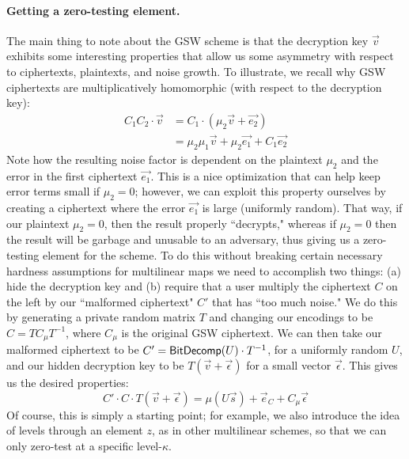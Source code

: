 \paragraph{Getting a zero-testing element.}
The main thing to note about the GSW scheme is that the decryption key $\vec{v}$ exhibits some interesting properties that allow us some asymmetry with respect to ciphertexts, plaintexts, and noise growth.  To illustrate, we recall why GSW ciphertexts are multiplicatively homomorphic (with respect to the decryption key):
\begin{align*}
C_1C_2\cdot \vec{v} &= C_1\cdot (\mu_2 \vec{v} + \vec{e_2})\\
&= \mu_2\mu_1 \vec{v} + \mu_2\vec{e_1}+ C_1\vec{e_2}
\end{align*}
Note how the resulting noise factor is dependent on the plaintext $\mu_2$ and the error in the first ciphertext $\vec{e_1}$.  This is a nice optimization that can help keep error terms small if $\mu_2 = 0$; however, we can exploit this property ourselves by creating a ciphertext where the error $\vec{e_1}$ is large (uniformly random).  That way, if our plaintext $\mu_2 = 0$, then the result properly ``decrypts," whereas if $\mu_2 = 0$ then the result will be garbage and unusable to an adversary, thus giving us a zero-testing element for the scheme.  To do this without breaking certain necessary hardness assumptions for multilinear maps we need to accomplish two things: (a) hide the decryption key and (b) require that a user multiply the ciphertext $C$ on the left by our ``malformed ciphertext" $C'$ that has ``too much noise."  We do this by generating a private random matrix $T$ and changing our encodings to be $C = TC_\mu T^{-1}$, where $C_\mu$ is the original GSW ciphertext.  We can then take our malformed ciphertext to be $C' = \mathsf{BitDecomp}(U)\cdot T^{-1}$, for a uniformly random $U$, and our hidden decryption key to be $T(\vec{v} + \vec{\epsilon})$ for a small vector $\vec{\epsilon}$.  This gives us the desired properties:
$$C'\cdot C \cdot T(\vec{v} + \vec{\epsilon}) = \mu (U\vec{s}) + \vec{e}_C + C_\mu\vec{\epsilon}$$
Of course, this is simply a starting point; for example, we also introduce the idea of levels through an element $z$, as in other multilinear schemes, so that we can only zero-test at a specific level-$\kappa$. 
